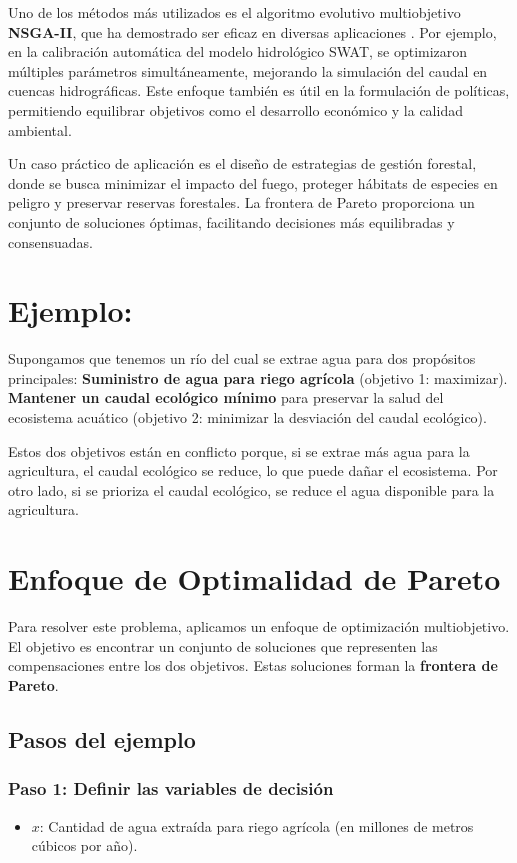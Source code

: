 \documentclass[12pt]{article}
\begin{document}
	Uno de los métodos más utilizados es el algoritmo evolutivo multiobjetivo \textbf{NSGA-II}, que ha demostrado ser eficaz en diversas aplicaciones \cite{Confesor2007}. Por ejemplo, en la calibración automática del modelo hidrológico SWAT, se optimizaron múltiples parámetros simultáneamente, mejorando la simulación del caudal en cuencas hidrográficas. Este enfoque también es útil en la formulación de políticas, permitiendo equilibrar objetivos como el desarrollo económico y la calidad ambiental.  
	
	Un caso práctico de aplicación es el diseño de estrategias de gestión forestal, donde se busca minimizar el impacto del fuego, proteger hábitats de especies en peligro y preservar reservas forestales. La frontera de Pareto proporciona un conjunto de soluciones óptimas, facilitando decisiones más equilibradas y consensuadas.  
	
	
	
	\section*{Ejemplo:}
	Supongamos que tenemos un río del cual se extrae agua para dos propósitos principales:
	\textbf{Suministro de agua para riego agrícola} (objetivo 1: maximizar).
	\textbf{Mantener un caudal ecológico mínimo} para preservar la salud del ecosistema acuático (objetivo 2: minimizar la desviación del caudal ecológico).
	
	Estos dos objetivos están en conflicto porque, si se extrae más agua para la agricultura, el caudal ecológico se reduce, lo que puede dañar el ecosistema. Por otro lado, si se prioriza el caudal ecológico, se reduce el agua disponible para la agricultura.
	
	\section*{Enfoque de Optimalidad de Pareto}
	Para resolver este problema, aplicamos un enfoque de optimización multiobjetivo. El objetivo es encontrar un conjunto de soluciones que representen las compensaciones entre los dos objetivos. Estas soluciones forman la \textbf{frontera de Pareto}.
	
	\subsection*{Pasos del ejemplo}
	
	\subsubsection*{Paso 1: Definir las variables de decisión}  
	\begin{itemize}
		\item \( x \): Cantidad de agua extraída para riego agrícola (en millones de metros cúbicos por año).
	\end{itemize}
	
\end{document}
